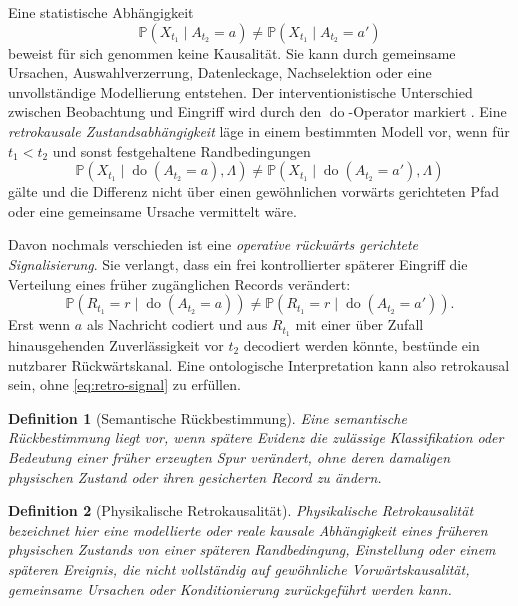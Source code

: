 \documentclass[11pt,a4paper]{article}
\newtheorem{definition}{Definition}[section]
\theoremstyle{remark}
\begin{document}
Eine statistische Abhängigkeit
\[
  \mathbb P(X_{t_1}\mid A_{t_2}=a)
  \neq
  \mathbb P(X_{t_1}\mid A_{t_2}=a')
\]
beweist für sich genommen keine Kausalität. Sie kann durch gemeinsame
Ursachen, Auswahlverzerrung, Datenleckage, Nachselektion oder eine
unvollständige Modellierung entstehen. Der interventionistische Unterschied
zwischen Beobachtung und Eingriff wird durch den
\(\operatorname{do}\)-Operator markiert \citep{Pearl2009}. Eine
\emph{retrokausale Zustandsabhängigkeit} läge in einem bestimmten Modell vor,
wenn für \(t_1<t_2\) und sonst festgehaltene Randbedingungen
\begin{equation}
\label{eq:retro-ontisch}
  \mathbb P\!\left(X_{t_1}\mid
  \operatorname{do}(A_{t_2}=a),\Lambda\right)
  \neq
  \mathbb P\!\left(X_{t_1}\mid
  \operatorname{do}(A_{t_2}=a'),\Lambda\right)
\end{equation}
gälte und die Differenz nicht über einen gewöhnlichen vorwärts gerichteten
Pfad oder eine gemeinsame Ursache vermittelt wäre.

Davon nochmals verschieden ist eine \emph{operative rückwärts gerichtete
Signalisierung}. Sie verlangt, dass ein frei kontrollierter späterer Eingriff
die Verteilung eines früher zugänglichen Records verändert:
\begin{equation}
\label{eq:retro-signal}
  \mathbb P\!\left(R_{t_1}=r\mid
  \operatorname{do}(A_{t_2}=a)\right)
  \neq
  \mathbb P\!\left(R_{t_1}=r\mid
  \operatorname{do}(A_{t_2}=a')\right).
\end{equation}
Erst wenn \(a\) als Nachricht codiert und aus \(R_{t_1}\) mit einer über
Zufall hinausgehenden Zuverlässigkeit vor \(t_2\) decodiert werden könnte,
bestünde ein nutzbarer Rückwärtskanal. Eine ontologische Interpretation kann
also retrokausal sein, ohne \cref{eq:retro-signal} zu erfüllen.

\begin{definition}[Semantische Rückbestimmung]
Eine semantische Rückbestimmung liegt vor, wenn spätere Evidenz die zulässige
Klassifikation oder Bedeutung einer früher erzeugten Spur verändert, ohne
deren damaligen physischen Zustand oder ihren gesicherten Record zu ändern.
\end{definition}

\begin{definition}[Physikalische Retrokausalität]
Physikalische Retrokausalität bezeichnet hier eine modellierte oder reale
kausale Abhängigkeit eines früheren physischen Zustands von einer späteren
Randbedingung, Einstellung oder einem späteren Ereignis, die nicht vollständig
auf gewöhnliche Vorwärtskausalität, gemeinsame Ursachen oder
Konditionierung zurückgeführt werden kann.
\end{definition}
\end{document}
